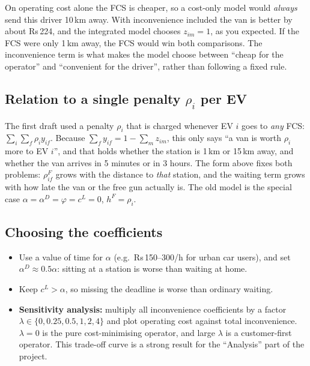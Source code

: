 \documentclass[11pt,a4paper]{article}
\begin{document}
On operating cost alone the FCS is cheaper, so a cost-only model would \emph{always} send this driver 10\,km away. With inconvenience included the van is better by about Rs\,224, and the integrated model chooses $z_{im}=1$, as you expected. If the FCS were only 1\,km away, the FCS would win both comparisons. The inconvenience term is what makes the model choose between ``cheap for the operator'' and ``convenient for the driver'', rather than following a fixed rule.

\subsection{Relation to a single penalty $\rho_i$ per EV}

The first draft used a penalty $\rho_i$ that is charged whenever EV $i$ goes to \emph{any} FCS: $\sum_i\sum_f\rho_iy_{if}$. Because $\sum_f y_{if}=1-\sum_m z_{im}$, this only says ``a van is worth $\rho_i$ more to EV $i$'', and that holds whether the station is 1\,km or 15\,km away, and whether the van arrives in 5 minutes or in 3 hours. The form above fixes both problems: $\rho^F_{if}$ grows with the distance to \emph{that} station, and the waiting term grows with how late the van or the free gun actually is. The old model is the special case $\alpha=\alpha^D=\varphi=c^L=0$, $h^F=\rho_i$.

\subsection{Choosing the coefficients}
\begin{itemize}[leftmargin=1.4em,itemsep=2pt]
  \item Use a value of time for $\alpha$ (e.g.\ Rs\,150--300/h for urban car users), and set $\alpha^D\approx0.5\alpha$: sitting at a station is worse than waiting at home.
  \item Keep $c^L>\alpha$, so missing the deadline is worse than ordinary waiting.
  \item \textbf{Sensitivity analysis:} multiply all inconvenience coefficients by a factor $\lambda\in\{0,0.25,0.5,1,2,4\}$ and plot operating cost against total inconvenience. $\lambda=0$ is the pure cost-minimising operator, and large $\lambda$ is a customer-first operator. This trade-off curve is a strong result for the ``Analysis'' part of the project.
\end{itemize}
\end{document}

